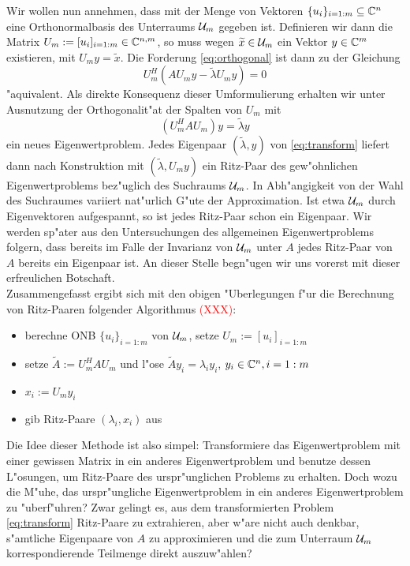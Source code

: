 Wir wollen nun annehmen, dass mit der Menge von Vektoren $\{u_i\}_{i=1:m}\subseteq \mathbb{C}^n$ eine Orthonormalbasis
des Unterraums $\mathcal{U}_m$ gegeben ist. Definieren wir dann die Matrix $U_m :=[u_i]_{i=1:m}\in\mathbb{C}^{n,m}$, so muss wegen $\widetilde{x}\in\mathcal{U}_m$
ein Vektor $y\in\mathbb{C}^m$ existieren, mit $U_m y = \widetilde{x}$. Die Forderung \eqref{eq:orthogonal}
ist dann zu der Gleichung
\[
U_m^H(AU_m y - \widetilde{\lambda} U_m y) = 0
\]
"aquivalent. Als direkte Konsequenz dieser Umformulierung erhalten wir unter Ausnutzung
der Orthogonalit"at der Spalten von $U_m$ mit
\begin{equation}\label{eq:transform}
(U_m^H A U_m) y = \widetilde{\lambda}y
\end{equation}
ein neues Eigenwertproblem. Jedes Eigenpaar $(\widetilde{\lambda},y)$ von \eqref{eq:transform}
liefert dann nach Konstruktion mit $(\widetilde{\lambda}, U_m y)$ ein Ritz-Paar des gew"ohnlichen
Eigenwertproblems bez"uglich des Suchraums $\mathcal{U}_m$. In Abh"angigkeit von der Wahl
des Suchraumes variiert nat"urlich G"ute der Approximation. Ist etwa $\mathcal{U}_m$
durch Eigenvektoren aufgespannt, so ist jedes Ritz-Paar schon ein Eigenpaar.
Wir werden sp"ater aus den Untersuchungen des allgemeinen Eigenwertproblems folgern,
dass bereits im Falle der Invarianz von $\mathcal{U}_m$ unter $A$ jedes Ritz-Paar von $A$ bereits ein Eigenpaar ist.
An dieser Stelle begn"ugen wir uns vorerst mit dieser erfreulichen Botschaft.\\

Zusammengefasst ergibt sich mit den obigen "Uberlegungen f"ur die Berechnung von
Ritz-Paaren folgender Algorithmus \textcolor{red}{(XXX)}:
\begin{itemize}
\item berechne ONB $\{u_i\}_{i=1:m}$ von $\mathcal{U}_m$, setze $U_m := [u_i]_{i=1:m}$
\item setze $\widetilde{A} := U_m^H AU_m$ und l"ose $\widetilde{A} y_i = \lambda_i y_i$, $y_i \in \mathbb{C}^n, i=1:m$
\item $x_i := U_m y_i$
\item gib Ritz-Paare $(\lambda_i, x_i)$ aus
\end{itemize}

Die Idee dieser Methode ist also simpel: Transformiere das Eigenwertproblem mit
einer gewissen Matrix in ein anderes Eigenwertproblem und benutze dessen L"osungen,
um Ritz-Paare des urspr"unglichen Problems zu erhalten.
Doch wozu die M"uhe, das urspr"ungliche Eigenwertproblem in ein anderes
Eigenwertproblem zu "uberf"uhren? Zwar gelingt es, aus dem transformierten Problem
\eqref{eq:transform} Ritz-Paare zu extrahieren, aber w"are nicht auch denkbar,
s"amtliche Eigenpaare von $A$ zu approximieren und die zum Unterraum $\mathcal{U}_m$
korrespondierende Teilmenge direkt auszuw"ahlen?\\

